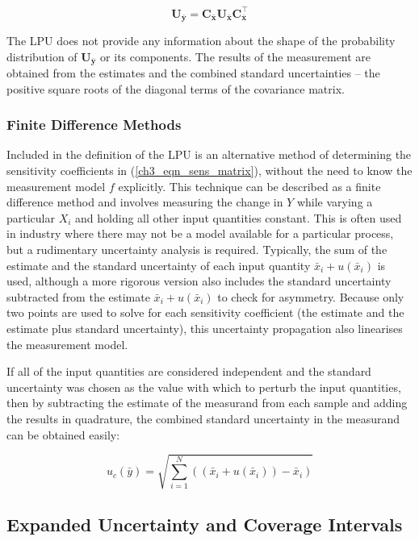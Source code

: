 \documentclass[../thesis/thesis.tex]{subfiles}
\begin{document}
\begin{refsection}
\begin{equation}
\boldsymbol U_{\bar{\boldsymbol y}} = \boldsymbol C_{\bar{\boldsymbol x}}\boldsymbol U_{\bar{\boldsymbol x}}\boldsymbol C_{\bar{\boldsymbol x}}^\top
\end{equation}

The LPU does not provide any information about the shape of the probability distribution of $\boldsymbol U_{\bar{\boldsymbol y}}$ or its components. The results of the measurement are obtained from the estimates and the combined standard uncertainties – the positive square roots of the diagonal terms of the covariance matrix.

\subsubsection{Finite Difference Methods} \label{ch3_sec_fd_methods}

Included in the definition of the LPU is an alternative method of determining the sensitivity coefficients in (\ref{ch3_eqn_sens_matrix}), without the need to know the measurement model $f$ explicitly. This technique can be described as a finite difference method and involves measuring the change in $Y$ while varying a particular $X_i$ and holding all other input quantities constant. This is often used in industry where there may not be a model available for a particular process, but a rudimentary uncertainty analysis is required. Typically, the sum of the estimate and the standard uncertainty of each input quantity $\bar{x}_i + u(\bar{x}_i)$ is used, although a more rigorous version also includes the standard uncertainty subtracted from the estimate $\bar{x}_i + u(\bar{x}_i)$ to check for asymmetry. Because only two points are used to solve for each sensitivity coefficient (the estimate and the estimate plus standard uncertainty), this uncertainty propagation also linearises the measurement model.

If all of the input quantities are considered independent and the standard uncertainty was chosen as the value with which to perturb the input quantities, then by subtracting the estimate of the measurand from each sample and adding the results in quadrature, the combined standard uncertainty in the measurand can be obtained easily:

\begin{equation}
u_c(\bar{y}) = \sqrt{\sum_{i=1}^{N}((\bar{x}_i+u(\bar{x}_i))-\bar{x}_i)}
\end{equation}

\subsection{Expanded Uncertainty and Coverage Intervals}


\end{refsection}
\end{document}

